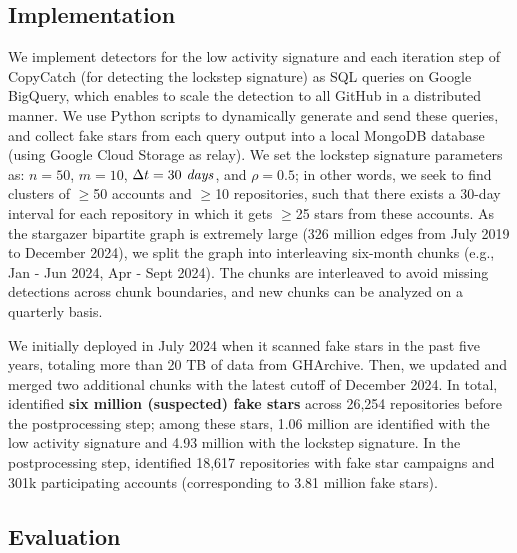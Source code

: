 \subsection{Implementation}
\label{sec:implementation}

We implement detectors for the low activity signature and each iteration step of \textsf{CopyCatch} (for detecting the lockstep signature) as SQL queries on Google BigQuery, which enables \SystemName to scale the detection to all GitHub in a distributed manner.
We use Python scripts to dynamically generate and send these queries, and collect  fake stars from each query output into a local MongoDB database (using Google Cloud Storage as relay).
We set the lockstep signature parameters as: $n=50$, $m=10$, $\Delta t = 30\text{\emph{~days}}$, and $\rho = 0.5$; in other words, we seek to find clusters of $\ge$50 accounts and $\ge$10 repositories, such that there exists a 30-day interval for each repository in which it gets $\ge$25 stars from these accounts.
As the stargazer bipartite graph is extremely large (326 million edges from July 2019 to December 2024), we split the graph into interleaving six-month chunks (e.g., Jan - Jun 2024, Apr - Sept 2024).
The chunks are interleaved to avoid missing detections across chunk boundaries, and new chunks can be analyzed on a quarterly basis.

We initially deployed \SystemName in July 2024 when it scanned fake stars in the past five years, totaling more than 20 TB of data from \textsf{GHArchive}.
Then, we updated and merged two additional chunks with the latest cutoff of December 2024.
In total, \SystemName identified \textbf{six million (suspected) fake stars} across 26,254 repositories %
before the postprocessing step; %
among these stars, 1.06 million are identified with the low activity signature and 4.93 million with the lockstep signature.
In the postprocessing step, \SystemName identified 18,617 repositories with fake star campaigns and 301k participating accounts (corresponding to 3.81 million fake stars).

\subsection{Evaluation}
\label{sec:evaluation}


